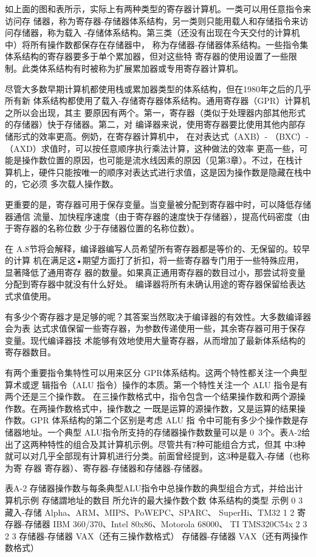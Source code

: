 如上面的图和表所示，实际上有两种类型的寄存器计算机。一类可以用任意指令来访问存
储器，称为寄存器-存储器体系结构，另一类则只能用载人和存储指令来访问存储器，称为载入
-存储体系结构。第三类（还没有出现在今天交付的计算机中）将所有操作数都保存在存储器中，
称为存储器-存储器体系结构。一些指令集体系结构的寄存器要多于单个累加器，但对这些特
寄存器的使用设置了一些限制。此类体系结构有时被称为扩展累加器或专用寄存器计算机。

尽管大多数早期计算机都使用栈或累加器类型的体系结构，但在1980年之后的几乎所有新
体系结构都使用了载入-存储寄存器体系结构。通用寄存器（GPR）计算机之所以会出现，其主
要原因有两个。第一，寄存器（类似于处理器内部其他形式的存储器）快于存储器。第二，对
编译器来说，使用寄存器要比使用其他内部存储形式的效率更高。例奶，在寄存器计算机中，
在对表达式（AXB）- （BXC）- （AXD）求值时，可以按任意顺序执行乘法计算，这种做法的效率
更高一些，可能是操作数位置的原因，也可能是流水线因素的原因（见第3章）。不过，在栈计
算机上，硬件只能按唯一的顺序对表达式进行求值，这是因为操作数是隐藏在栈中的，它必须
多次载人操作数。

更重要的是，寄存器可用于保存变量。当变量被分配到寄存器中时，可以降低存储器通信
流量、加快程序速度（由于寄存器的速度快于存储器），提高代码密度（由于寄存器的名称位数
少于存储器位置的名称位数）。

在 A.8节将会解释，编译器编写人员希望所有寄存器都是等价的、无保留的。较早的计算
机在满足这•期望方面打了折扣，将一些寄存器专门用于一些特殊应用，显著降低了通用寄存
器的数量。如果真正通用寄存器的数目过小，那尝试将变量分配到寄存器中就没有什么好处。
编译器将所有未确认用途的寄存器保留给表达式求值使用。

有多少个寄存器才是足够的呢？其答案当然取决于编译器的有效性。大多数编译器会为表
达式求值保留一些寄存器，为参数传递使用一些，其余寄存器可用于保存变量。现代编译器技
术能够有效地使用大量寄存器，从而增加了最新体系结构的寄存器数目。

有两个重要指令集特性可以用来区分 GPR体系结构。这两个特性都关注一个典型算术或逻
辑指令（ALU 指令）操作的本质。第一个特性关注一个 ALU 指令是有两个还是三个操作数。
在三操作数格式中，指令包含一个结果操作数和两个源操作数。在两操作数格式中，操作数之
一既是运算的源操作数，又是运算的结果操作数。GPR 体系结构的第二个区别是考虑 ALU 指
令中可能有多少个操作数是存储器地址。一个典型 ALU指令所支持的存储器操作数数量可以是
0~3个。表A-2给出了这两种特性的组合及其计算机示例。尽管共有7种可能组合方式，但其
中3种就可以对几乎全部现有计算机进行分类。前面曾经提到，这3种是载入-存储（也称为寄
存器 寄存器）、寄存器-存储器和存储器-存储器。

表A-2 存储器操作数与每条典型ALU指令中总操作数的典型组合方式，并给出计算机示例
存储謂地址的数目
所允许的最大操作数个数
体系结构的类型
示例
0
3
藏入-存储
Alpha、ARM、MIPS、PoWEPC、SPARC、
SuperHi、TM32
1
2
寄存器-存储器
IBM 360/370、Intel 80x86、Motorola 68000、
TI TMS320C54x
2
3
2
3
存储器-存储器
VAX（还有三操作数格式）
存储器-存储器
VAX（还有两操作数格式）

